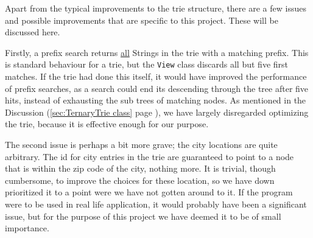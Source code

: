 Apart from the typical improvements to the trie structure, there are a few issues and possible improvements that are specific to this project. These will be discussed here.

Firstly, a prefix search returns \underline{all} Strings in the trie with a matching prefix.
This is standard behaviour for a trie, but the \texttt{View} class discards all but five first matches. If the trie had done this itself, it would have improved the performance of prefix searches, as a search could end its descending through the tree after five hits, instead of exhausting the sub trees of matching nodes. As mentioned in the Discussion (\ref{sec:TernaryTrie class} page \pageref{sec:TernaryTrie class}),
we have largely disregarded optimizing the trie, because it is effective enough for our purpose.

The second issue is perhaps a bit more grave; the city locations are quite arbitrary.
The id for city entries in the trie are guaranteed to point to a node that is within the zip code of the city, nothing more. It is trivial, though cumbersome, to improve the choices for these location, so we have down prioritized it to a point were we have not gotten around to it.
If the program were to be used in real life application, it would probably have been a significant issue, but for the purpose of this project we have deemed it to be of small importance.
